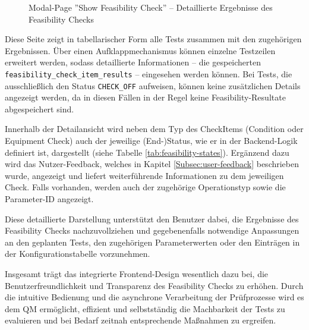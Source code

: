 \begin{figure}[!htbp] 
    \centering 
    \caption{Modal-Page ''Show Feasibility Check'' – Detaillierte Ergebnisse des Feasibility Checks} 
    \label{fig:result-details} 
\end{figure}

Diese Seite zeigt in tabellarischer Form alle Tests zusammen mit den zugehörigen Ergebnissen. Über einen Aufklappmechanismus können einzelne Testzeilen erweitert werden, sodass detaillierte Informationen – die gespeicherten \texttt{feasibility\_check\_item\_results} – eingesehen werden können. Bei Tests, die ausschließlich den Status \texttt{CHECK\_OFF} aufweisen, können keine zusätzlichen Details angezeigt werden, da in diesen Fällen in der Regel keine Feasibility-Resultate abgespeichert sind.

Innerhalb der Detailansicht wird neben dem Typ des CheckItems (Condition oder Equipment Check) auch der jeweilige (End-)Status, wie er in der Backend-Logik definiert ist, dargestellt (siehe Tabelle \ref{tab:feasibility-states}). Ergänzend dazu wird das Nutzer-Feedback, welches in Kapitel \ref{Subsec:user-feedback} beschrieben wurde, angezeigt und liefert weiterführende Informationen zu dem jeweiligen Check. Falls vorhanden, werden auch der zugehörige Operationstyp sowie die Parameter-ID angezeigt.

Diese detaillierte Darstellung unterstützt den Benutzer dabei, die Ergebnisse des Feasibility Checks nachzuvollziehen und gegebenenfalls notwendige Anpassungen an den geplanten Tests, den zugehörigen Parameterwerten oder den Einträgen in der Konfigurationstabelle vorzunehmen.

Insgesamt trägt das integrierte Frontend-Design wesentlich dazu bei, die Benutzerfreundlichkeit und Transparenz des Feasibility Checks zu erhöhen. Durch die intuitive Bedienung und die asynchrone Verarbeitung der Prüfprozesse wird es dem \gls{QM} ermöglicht, effizient und selbstständig die Machbarkeit der Tests zu evaluieren und bei Bedarf zeitnah entsprechende Maßnahmen zu ergreifen.


